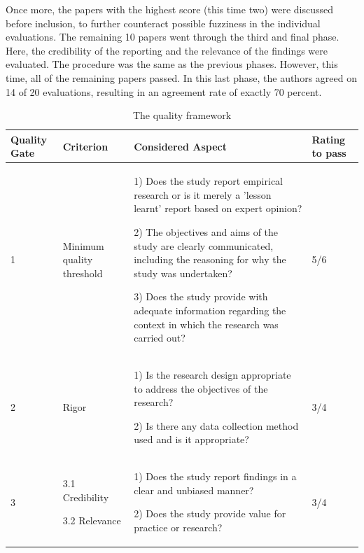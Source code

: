 \documentclass{bmcart}
\begin{document}
Once more, the papers with the highest score (this time two) were discussed before inclusion, to further counteract possible fuzziness in the individual evaluations.  The remaining 10 papers went through the third and final phase. Here, the credibility of the reporting and the relevance of the findings were evaluated. The procedure was the same as the previous phases. However, this time, all of the remaining papers passed. In this last phase, the authors agreed on 14 of 20 evaluations, resulting in an agreement rate of exactly 70 percent. 

\begin{table}[h]
    \renewcommand{\arraystretch}{1.5}
    \caption[]{The quality framework}
    \begin{tabular}{|p{0.7cm}|p{2cm}|p{6cm}|p{1.5cm}|}
        \hline
        Quality Gate & Criterion & Considered Aspect & Rating to pass \\ 

        \hline

        1 & Minimum quality threshold & 
        
        1) Does the study report empirical research or is it merely a 'lesson learnt' report based on expert opinion?

        2) The objectives and aims of the study are clearly communicated, including the reasoning for why the study was undertaken?

        3) Does the study provide with adequate information regarding the context in which the research was carried out?
        & 5/6 \\ 
        \hline
        2 & Rigor & 
        
        1) Is the research design appropriate to address the objectives of the research?

        2) Is there any data collection method used and is it appropriate?
        & 3/4 \\ 
        \hline  
        3 &
        3.1 Credibility 

        3.2 Relevance 
        & 
        1) Does the study report findings in a clear and unbiased manner?

        2) Does the study provide value for practice or research?
        & 
        3/4 \\ 
        \hline   
    \end{tabular}
    \label{qualityFramework}
\end{table}
\end{document}
